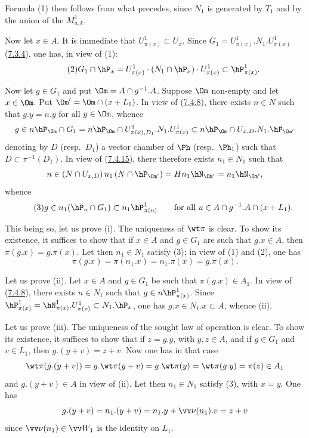 \documentclass[12pt,a4paper,oneside,english]{smfart}
\makeatletter
\newcommand{\btpageanchor}[1]{\Hy@raisedlink{\hypertarget{p:#1}{}}}
\newcommand{\btref}[1]{\hyperlink{bt:#1}{#1}}
\newcommand{\btpage}[1]{\marginnote{p.~#1}\btpageanchor{#1}}
\newcommand{\pg}[1]{\btpage{#1}}
\theoremstyle{definition}
\theoremstyle{bt}
\makeatother
\begin{document}
Formula (1) then follows from what precedes, since $N_1$ is generated by $T_1$ and by
the union of the $M^1_{a,k}$.

Now let $x\in A$. It is immediate that $U^1_{\pi(x)}\subset U_x$. Since
$G_1=U^1_{\pi(x)}.N_1.U^1_{\pi(x)}$ (\btref{7.3.4}), one has, in view of (1):
\begin{equation}\tag{2}
G_1\cap\hP_x=U^1_{\pi(x)}\cdot(N_1\cap\hP_x)\cdot U^1_{\pi(x)}\subset\hP^1_{\pi(x)} .
\end{equation}

Now let $g\in G_1$ and put $\Om=A\cap g^{-1}.A$. Suppose $\Om$ non-empty and let
$x\in\Om$. Put $\Om'=\Om\cap(x+L_1)$. In view of (\btref{7.4.8}), there exists $n\in N$ such
that $g.y=n.y$ for all $y\in\Om$, whence
\[
g\in n\hP_\Om\cap G_1=n\hP_\Om\cap U^1_{\pi(x),D_1}.N_1.U^1_{\pi(x)}
\subset n\hP_\Om\cap U_{x,D}.N_1.\hP_{\Om'}
\]
denoting by $D$ (resp.\ $D_1$) a vector chamber of $\Ph$ (resp.\ $\Ph_1$) such that
$D\subset\pi^{-1}(D_1)$. In view of (\btref{7.4.15}), there therefore exists $n_1\in N_1$ such
that
\[
n\in(N\cap U_{x,D})\,n_1\,(N\cap\hP_{\Om'})=Hn_1\hN_{\Om'}=n_1\hN_{\Om'},
\]
whence
\begin{equation}\tag{3}
g\in n_1(\hP_u\cap G_1)\subset n_1\hP^1_{\pi(u)}\qquad
\text{for all }u\in A\cap g^{-1}.A\cap(x+L_1).
\end{equation}

This being so, let us prove (i). The uniqueness of $\wt\pi$ is clear. To show its
existence, it suffices to show that if $x\in A$ and $g\in G_1$ are such that $g.x\in A$,
then $\pi(g.x)=g.\pi(x)$. Let then $n_1\in N_1$ satisfy (3); in view of (1) and (2), one
has
\[
\pi(g.x)=\pi(n_1.x)=n_1.\pi(x)=g.\pi(x).
\]

\pg{186}
Let us prove (ii). Let $x\in A$ and $g\in G_1$ be such that $\pi(g.x)\in A_1$. In view
of (\btref{7.4.8}), there exists $n\in N_1$ such that $g\in n\hP^1_{\pi(x)}$. Since
$\hP^1_{\pi(x)}=\hN^1_{\pi(x)}.U^1_{\pi(x)}\subset N_1.\hP_x$, one has
$g.x\in N_1.x\subset A$, whence (ii).

Let us prove (iii). The uniqueness of the sought law of operation is clear. To show its
existence, it suffices to show that if $z=g.y$, with $y,z\in A$, and if $g\in G_1$ and
$v\in L_1$, then $g.(y+v)=z+v$. Now one has in that case
\[
\wt\pi(g.(y+v))=g.\wt\pi(y+v)=g.\wt\pi(y)=\wt\pi(g.y)=\pi(z)\in A_1
\]
and $g.(y+v)\in A$ in view of (ii). Let then $n_1\in N_1$ satisfy (3), with $x=y$. One
has
\[
g.(y+v)=n_1.(y+v)=n_1.y+\vv\nu(n_1).v=z+v
\]
since $\vv\nu(n_1)\in\vv W_1$ is the identity on $L_1$.
\end{document}
